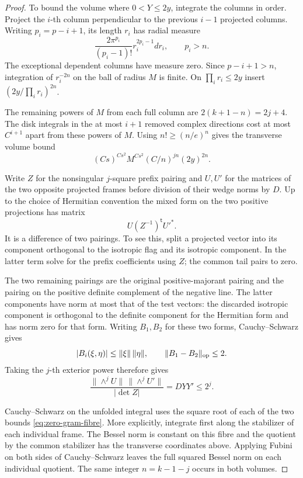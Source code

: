 \begin{proof}
To bound the volume where \(0<Y\le 2y\), integrate the columns in order. Project the \(i\)-th column perpendicular to the previous \(i-1\) projected columns. Writing \(p_i=p-i+1\), its length \(r_i\) has radial measure
\[
             \frac{2\pi^{p_i}}{(p_i-1)!}r_i^{2p_i-1}dr_i,
             \qquad p_i>n.
\]
The exceptional dependent columns have measure zero. Since \(p-i+1>n\), integration of \(r_i^{-2n}\) on the ball of radius \(M\) is finite. On \(\prod_i r_i\le2y\) insert \((2y/\prod_i r_i)^{2n}\). 

The remaining powers of \(M\) from each full column are \(2(k+1-n)=2j+4\). The disk integrals in the at most \(i+1\) removed complex directions cost at most \(C^{i+1}\) apart from these powers of \(M\). Using \(n!\ge(n/e)^n\) gives the transverse volume bound
\begin{equation}\label{eq:zero-gram-fibre}
 (Cs)^{Cs^2}M^{Cs^2}(C/n)^{jn}(2y)^{2n}.
\end{equation}

Write \(Z\) for the nonsingular \(j\)-square prefix pairing and \(U,U'\) for the matrices of the two opposite projected frames before division of their wedge norms by \(D\). Up to the choice of Hermitian convention the mixed form on the two positive projections has matrix
\[
                         U (Z^{-1})^{\mathsf t} U'^* .
\]
It is a difference of two pairings. To see this, split a projected vector into its component orthogonal to the isotropic flag and its isotropic component. In the latter term solve for the prefix coefficients using \(Z\); the common tail pairs to zero. 

The two remaining pairings are the original positive-majorant pairing and the pairing on the positive definite complement of the negative line. The latter components have norm at most that of the test vectors: the discarded isotropic component is orthogonal to the definite component for the Hermitian form and has norm zero for that form. Writing \(B_1,B_2\) for these two forms, Cauchy--Schwarz gives
\[
 |B_i(\xi,\eta)|\le\|\xi\|\,\|\eta\|,\qquad
                  \|B_1-B_2\|_{\rm op}\le2 .
\] Taking the \(j\)-th exterior power therefore gives
\[
 \frac{\|\wedge^j U\|\,\|\wedge^j U'\|}{|\det Z|}
                 =DYY'\le 2^j .
\]


Cauchy--Schwarz on the unfolded integral uses the square root of each of the two bounds \eqref{eq:zero-gram-fibre}. More explicitly, integrate first along the stabilizer of each individual frame. The Bessel norm is constant on this fibre and the quotient by the common stabilizer has the transverse coordinates above. Applying Fubini on both sides of Cauchy--Schwarz leaves the full squared Bessel norm on each individual quotient. The same integer \(n=k-1-j\) occurs in both volumes.


\end{proof}
